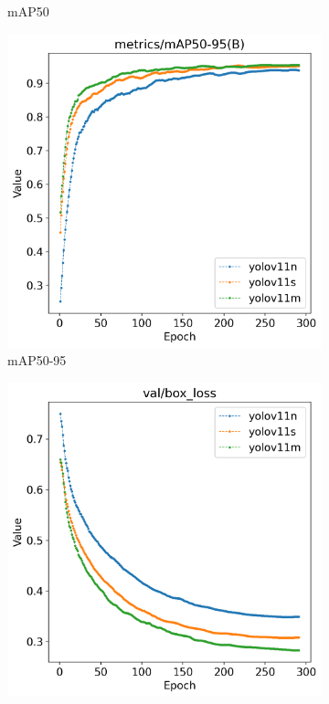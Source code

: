 \begin{figure}[H]
\begin{subfigure}[t]{0.43\textwidth}
        \caption{mAP50}
        \label{fig:helmet_metrics_mAP50}
    \end{subfigure}
    \begin{subfigure}[t]{0.43\textwidth}
        \centering
        \includegraphics[width=\textwidth]{figs/chap04/helmet_result/helmet_metrics_mAP50-95(B).png}
        \caption{mAP50-95}
        \label{fig:helmet_metrics_mAP50-95}
    \end{subfigure}
    \begin{subfigure}[t]{0.43\textwidth}
        \centering
        \includegraphics[width=\textwidth]{figs/chap04/helmet_result/helmet_val_box_loss.png}

\end{subfigure}
\end{figure}
